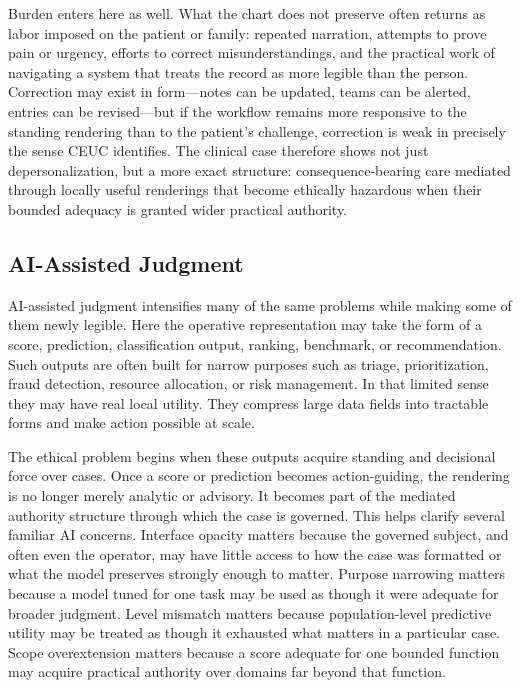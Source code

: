 \documentclass[11pt]{article}
\begin{document}
Burden enters here as well. What the chart does not preserve often returns as labor imposed on the patient or family: repeated narration, attempts to prove pain or urgency, efforts to correct misunderstandings, and the practical work of navigating a system that treats the record as more legible than the person. Correction may exist in form---notes can be updated, teams can be alerted, entries can be revised---but if the workflow remains more responsive to the standing rendering than to the patient's challenge, correction is weak in precisely the sense CEUC identifies. The clinical case therefore shows not just depersonalization, but a more exact structure: consequence-bearing care mediated through locally useful renderings that become ethically hazardous when their bounded adequacy is granted wider practical authority.

\subsection{AI-Assisted Judgment}

AI-assisted judgment intensifies many of the same problems while making some of them newly legible. Here the operative representation may take the form of a score, prediction, classification output, ranking, benchmark, or recommendation. Such outputs are often built for narrow purposes such as triage, prioritization, fraud detection, resource allocation, or risk management. In that limited sense they may have real local utility. They compress large data fields into tractable forms and make action possible at scale. \cite{LepriEtAl2018FairTransparentAccountableADM,Tabassi2023NISTAIRMF}

The ethical problem begins when these outputs acquire standing and decisional force over cases. Once a score or prediction becomes action-guiding, the rendering is no longer merely analytic or advisory. It becomes part of the mediated authority structure through which the case is governed. This helps clarify several familiar AI concerns. Interface opacity matters because the governed subject, and often even the operator, may have little access to how the case was formatted or what the model preserves strongly enough to matter. Purpose narrowing matters because a model tuned for one task may be used as though it were adequate for broader judgment. Level mismatch matters because population-level predictive utility may be treated as though it exhausted what matters in a particular case. Scope overextension matters because a score adequate for one bounded function may acquire practical authority over domains far beyond that function. \cite{LepriEtAl2018FairTransparentAccountableADM,Tabassi2023NISTAIRMF}
\end{document}
